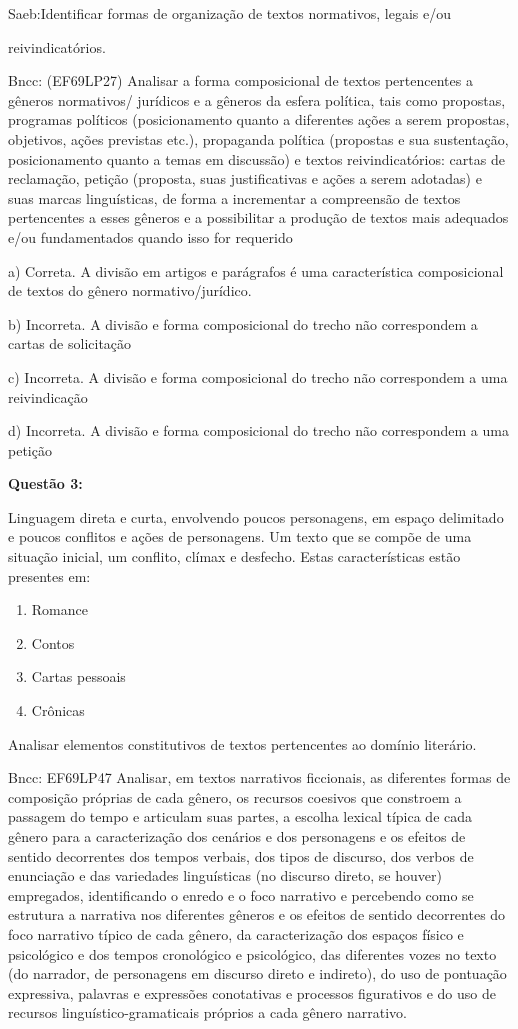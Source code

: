Saeb:Identificar formas de organização de textos normativos, legais e/ou

reivindicatórios.

Bncc: (EF69LP27) Analisar a forma composicional de textos pertencentes a
gêneros normativos/ jurídicos e a gêneros da esfera política, tais como
propostas, programas políticos (posicionamento quanto a diferentes ações
a serem propostas, objetivos, ações previstas etc.), propaganda política
(propostas e sua sustentação, posicionamento quanto a temas em
discussão) e textos reivindicatórios: cartas de reclamação, petição
(proposta, suas justificativas e ações a serem adotadas) e suas marcas
linguísticas, de forma a incrementar a compreensão de textos
pertencentes a esses gêneros e a possibilitar a produção de textos mais
adequados e/ou fundamentados quando isso for requerido

a) Correta. A divisão em artigos e parágrafos é uma característica
composicional de textos do gênero normativo/jurídico.

b) Incorreta. A divisão e forma composicional do trecho não correspondem
a cartas de solicitação

c) Incorreta. A divisão e forma composicional do trecho não correspondem
a uma reivindicação

d) Incorreta. A divisão e forma composicional do trecho não correspondem
a uma petição

\textbf{Questão 3:}

Linguagem direta e curta, envolvendo poucos personagens, em espaço
delimitado e poucos conflitos e ações de personagens. Um texto que se
compõe de uma situação inicial, um conflito, clímax e desfecho. Estas
características estão presentes em:

\begin{enumerate}
\def\labelenumi{\alph{enumi})}
\item
  Romance
\item
  Contos
\item
  Cartas pessoais
\item
  Crônicas
\end{enumerate}

Analisar elementos constitutivos de textos pertencentes ao domínio
literário.

Bncc: EF69LP47 Analisar, em textos narrativos ficcionais, as diferentes
formas de composição próprias de cada gênero, os recursos coesivos que
constroem a passagem do tempo e articulam suas partes, a escolha lexical
típica de cada gênero para a caracterização dos cenários e dos
personagens e os efeitos de sentido decorrentes dos tempos verbais, dos
tipos de discurso, dos verbos de enunciação e das variedades
linguísticas (no discurso direto, se houver) empregados, identificando o
enredo e o foco narrativo e percebendo como se estrutura a narrativa nos
diferentes gêneros e os efeitos de sentido decorrentes do foco narrativo
típico de cada gênero, da caracterização dos espaços físico e
psicológico e dos tempos cronológico e psicológico, das diferentes vozes
no texto (do narrador, de personagens em discurso direto e indireto), do
uso de pontuação expressiva, palavras e expressões conotativas e
processos figurativos e do uso de recursos linguístico-gramaticais
próprios a cada gênero narrativo.

